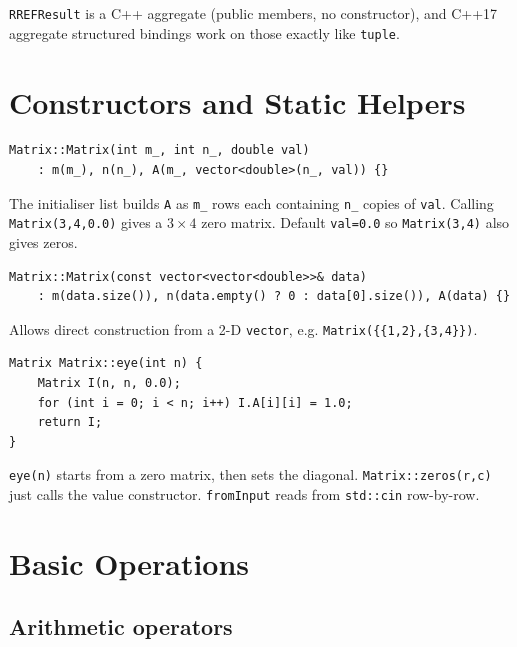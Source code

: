 \documentclass[12pt, a4paper]{article}
\newcommand{\code}[1]{\texttt{\small#1}}
\newcommand{\fn}[1]{\texttt{\small\color{funcgreen}#1}}
\begin{document}
\code{RREFResult} is a C++ aggregate (public members, no constructor), and
C++17 aggregate structured bindings work on those exactly like \code{tuple}.

\section{Constructors and Static Helpers}

\begin{lstlisting}
Matrix::Matrix(int m_, int n_, double val)
    : m(m_), n(n_), A(m_, vector<double>(n_, val)) {}
\end{lstlisting}

The initialiser list builds \code{A} as \code{m\_} rows each containing
\code{n\_} copies of \code{val}.  Calling \code{Matrix(3,4,0.0)} gives a
$3\times4$ zero matrix.  Default \code{val=0.0} so \code{Matrix(3,4)} also
gives zeros.

\begin{lstlisting}
Matrix::Matrix(const vector<vector<double>>& data)
    : m(data.size()), n(data.empty() ? 0 : data[0].size()), A(data) {}
\end{lstlisting}

Allows direct construction from a 2-D \code{vector}, e.g.
\code{Matrix(\{\{1,2\},\{3,4\}\})}.

\medskip
\begin{lstlisting}
Matrix Matrix::eye(int n) {
    Matrix I(n, n, 0.0);
    for (int i = 0; i < n; i++) I.A[i][i] = 1.0;
    return I;
}
\end{lstlisting}

\fn{eye(n)} starts from a zero matrix, then sets the diagonal.
\code{Matrix::zeros(r,c)} just calls the value constructor.
\fn{fromInput} reads from \code{std::cin} row-by-row.

\section{Basic Operations}

\subsection{Arithmetic operators}
\end{document}
